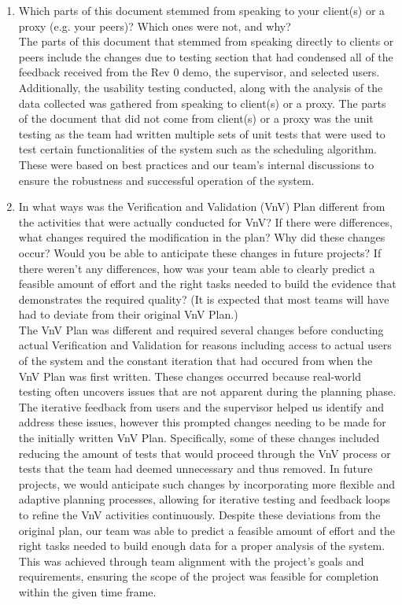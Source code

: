 \documentclass[12pt, titlepage]{article}
\begin{document}
  \begin{enumerate}
    \item Which parts of this document stemmed from speaking to your client(s) or
    a proxy (e.g. your peers)? Which ones were not, and why?\\

    The parts of this document that stemmed from speaking directly to clients or peers include
    the changes due to testing section that had condensed all of the feedback received from the
    Rev 0 demo, the supervisor, and selected users. Additionally, the usability testing conducted,
    along with the analysis of the data collected was gathered from speaking to client(s) or a proxy.
    The parts of the document that did not come from client(s) or a proxy was the unit testing as
    the team had written multiple sets of unit tests that were used to test certain functionalities
    of the system such as the scheduling algorithm. These were based on best practices and our team's
    internal discussions to ensure the robustness and successful operation of the system.\\
    
    \item In what ways was the Verification and Validation (VnV) Plan different
    from the activities that were actually conducted for VnV?  If there were
    differences, what changes required the modification in the plan?  Why did
    these changes occur?  Would you be able to anticipate these changes in future
    projects?  If there weren't any differences, how was your team able to clearly
    predict a feasible amount of effort and the right tasks needed to build the
    evidence that demonstrates the required quality?  (It is expected that most
    teams will have had to deviate from their original VnV Plan.)\\

    The VnV Plan was different and required several changes before conducting actual Verification
    and Validation for reasons including access to actual users of the system and the constant
    iteration that had occured from when the VnV Plan was first written.
    These changes occurred because real-world testing often uncovers issues that
    are not apparent during the planning phase. The iterative feedback from users
    and the supervisor helped us identify and address these issues, however this prompted changes
    needing to be made for the initially written VnV Plan. Specifically, some of these changes included
    reducing the amount of tests that would proceed through the VnV process or tests that the team
    had deemed unnecessary and thus removed. In future projects, we would anticipate such changes by
    incorporating more flexible and adaptive planning processes, allowing for iterative testing and
    feedback loops to refine the VnV activities continuously.
    Despite these deviations from the original plan, our team was able to predict a feasible amount of effort
    and the right tasks needed to build enough data for a proper analysis of the system.
    This was achieved through team alignment with the project's goals and requirements, ensuring
    the scope of the project was feasible for completion within the given time frame.


\end{enumerate}
\end{document}
